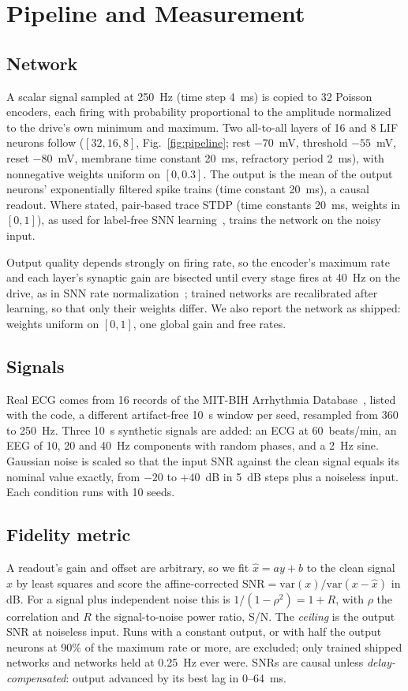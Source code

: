 \documentclass[conference]{IEEEtran}
\newcommand{\SN}{R}            %
\newcommand{\dB}{~dB}
\begin{document}
\section{Pipeline and Measurement}
\label{sec:methods}

\subsection{Network}
A scalar signal sampled at 250~Hz (time step 4~ms) is copied to 32 Poisson
encoders, each firing with probability proportional to the amplitude
normalized to the drive's own minimum and maximum. Two all-to-all layers of 16
and 8 LIF neurons follow ($[32,16,8]$, Fig.~\ref{fig:pipeline}; rest
$-70$~mV, threshold $-55$~mV, reset $-80$~mV, membrane time constant 20~ms,
refractory period 2~ms), with nonnegative weights uniform on $[0, 0.3]$. The
output is the mean of the output neurons' exponentially filtered spike trains
(time constant 20~ms), a causal readout. Where stated, pair-based trace STDP
(time constants 20~ms, weights in $[0,1]$), as used for label-free SNN
learning~\cite{diehl2015unsupervised}, trains the network on the noisy input.

Output quality depends strongly on firing rate, so the encoder's maximum rate
and each layer's synaptic gain are bisected until every stage fires at 40~Hz
on the drive, as in SNN rate
normalization~\cite{diehl2015balancing,rueckauer2017conversion}; trained
networks are recalibrated after learning, so that only their weights differ.
We also report the network as shipped: weights uniform on $[0,1]$, one global
gain and free rates.

\subsection{Signals}
Real ECG comes from 16 records of the MIT-BIH Arrhythmia
Database~\cite{moody2001impact,goldberger2000physionet}, listed with the code,
a different artifact-free 10~s window per seed, resampled from 360 to 250~Hz.
Three 10~s synthetic signals are added: an ECG at 60~beats/min, an EEG of 10,
20 and 40~Hz components with random phases, and a 2~Hz sine. Gaussian noise
is scaled so that the input SNR against the clean signal equals its nominal
value exactly, from $-20$ to $+40$\dB{} in 5\dB{} steps plus a noiseless
input. Each condition runs with 10 seeds.

\subsection{Fidelity metric}
A readout's gain and offset are arbitrary, so we fit $\hat{x} = ay + b$ to the
clean signal $x$ by least squares and score the affine-corrected
$\mathrm{SNR} = \mathrm{var}(x)/\mathrm{var}(x-\hat{x})$ in dB. For a signal
plus independent noise this is $1/(1-\rho^2) = 1 + \SN$, with $\rho$ the
correlation and $\SN$ the signal-to-noise power ratio, S/N. The
\emph{ceiling} is the output SNR at noiseless input. Runs with a constant
output, or with half the output neurons at 90\% of the maximum rate or more,
are excluded; only trained shipped networks and networks held at 0.25~Hz ever
were. SNRs are causal unless \emph{delay-compensated}: output advanced by its
best lag in 0--64~ms.
\end{document}
